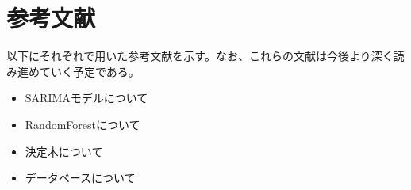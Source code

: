 \documentclass{scrartcl}
\begin{document}
\section{参考文献}
\label{sec:org9906ee8}
以下にそれぞれで用いた参考文献を示す。なお、これらの文献は今後より深く読み進めていく予定である。\\
\begin{itemize}
\item SARIMAモデルについて \cite{sarima01} \cite{sarima02} \cite{sarima03} \cite{sarima04} \cite{sarima05}\\
\item RandomForestについて \cite{rf01} \cite{rf02} \cite{rf03} \cite{rf04} \cite{rf05} \cite{rf06} \cite{rf07} \cite{Breiman:2001:RF:570181.570182} \cite{rf08} \cite{rf09}\\
\item 決定木について \cite{tree01}\\
\item データベースについて \cite{hbase01} \cite{hbase02} \cite{hbase03}\\
\end{itemize}

\printbibliography\\
\end{document}
